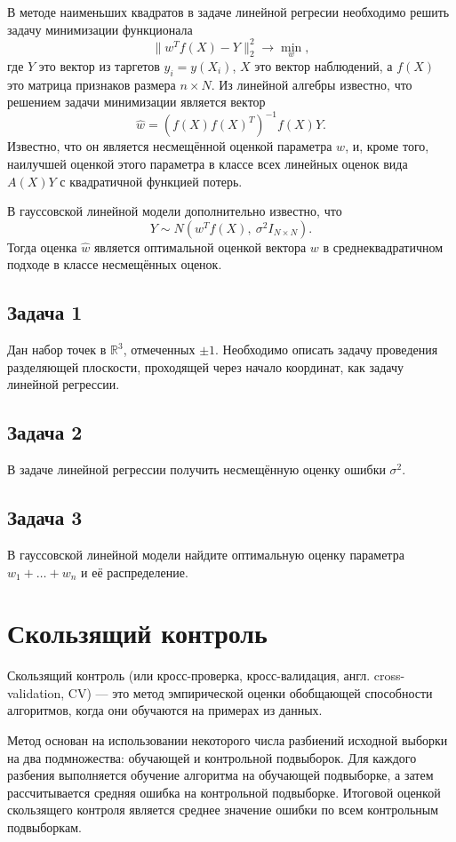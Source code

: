 В методе наименьших квадратов в задаче линейной регресии необходимо решить задачу минимизации функционала
\[
    \lVert{w^Tf(X) - Y}\rVert_2^2 \to \min_w,
\]
где $Y$ это вектор из таргетов $y_i = y(X_i)$, $X$ это вектор наблюдений, а $f(X)$ это матрица признаков размера $n \times N$.
Из линейной алгебры известно, что решением задачи минимизации является вектор
\[
    \hat{w} = (f(X)f(X)^T)^{-1}f(X)Y.
\]
Известно, что он является несмещённой оценкой параметра $w$, и, кроме того, наилучшей оценкой этого параметра в классе всех линейных оценок вида $A(X)Y$ с квадратичной функцией потерь.

В гауссовской линейной модели дополнительно известно, что
\[
    Y \sim N\left( w^Tf(X),\ \sigma^2 I_{N\times N} \right).
\]
Тогда оценка $\hat{w}$ является оптимальной оценкой вектора $w$ в среднеквадратичном подходе в классе несмещённых оценок.

\subsection*{Задача 1}

Дан набор точек в $\mathbb{R}^3$, отмеченных $\pm1$.
Необходимо описать задачу проведения разделяющей плоскости, проходящей через начало координат, как задачу линейной регрессии.

\subsection*{Задача 2}

В задаче линейной регрессии получить несмещённую оценку ошибки $\sigma^2$.

\subsection*{Задача 3}

В гауссовской линейной модели найдите оптимальную оценку параметра $w_1 + \ldots +w_n$ и её распределение.

\section{Скользящий контроль}

Скользящий контроль (или кросс-проверка, кросс-валидация, англ. cross-validation, CV) — это метод эмпирической оценки  обобщающей способности алгоритмов, когда они обучаются на примерах из данных.

Метод основан на использовании некоторого числа разбиений исходной выборки на два подмножества: обучающей и контрольной подвыборок. Для каждого разбения выполняется обучение алгоритма на обучающей подвыборке, а затем рассчитывается средняя ошибка на контрольной подвыборке. Итоговой оценкой скользящего контроля является среднее значение ошибки по всем контрольным подвыборкам.

